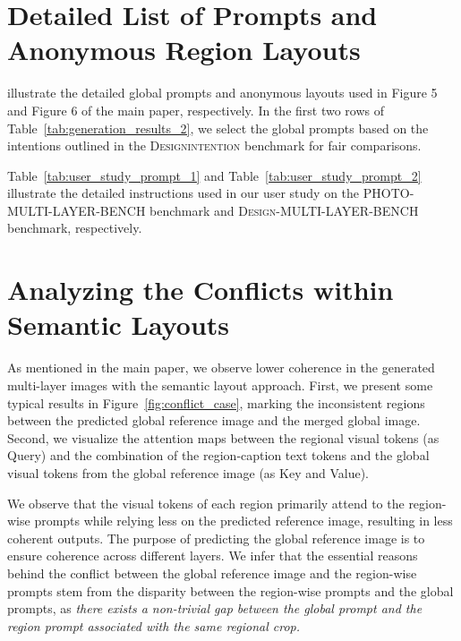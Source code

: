 \clearpage

\setcounter{page}{1}
\setcounter{section}{0}
\setcounter{figure}{0}
\setcounter{table}{0}
\setcounter{equation}{0}

\maketitlesupplementary


\vspace{1mm}
\section{Detailed List of Prompts and Anonymous Region Layouts}
 illustrate the detailed global prompts and anonymous layouts used in Figure 5 and Figure 6 of the main paper, respectively.
In the first two rows of Table~\ref{tab:generation_results_2}, we select the global prompts based on the intentions outlined in the \textsc{Designintention} benchmark for fair comparisons.

Table~\ref{tab:user_study_prompt_1} and Table~\ref{tab:user_study_prompt_2} illustrate the detailed instructions used in our user study on the \textsc{PHOTO-MULTI-LAYER-BENCH} benchmark and \textsc{Design-MULTI-LAYER-BENCH} benchmark, respectively.

\vspace{1mm}
\section{Analyzing the Conflicts within Semantic Layouts}
As mentioned in the main paper, we observe lower coherence in the generated multi-layer images with the semantic layout approach.
First, we present some typical results in Figure~\ref{fig:conflict_case}, marking the inconsistent regions between the predicted global reference image and the merged global image. Second, we visualize the attention maps between the regional visual tokens (as Query) and the combination of the region-caption text tokens and the global visual tokens from the global reference image (as Key and Value).

We observe that the visual tokens of each region primarily attend to the region-wise prompts while relying less on the predicted reference image, resulting in less coherent outputs. The purpose of predicting the global reference image is to ensure coherence across different layers. We infer that the essential reasons behind the conflict between the global reference image and the region-wise prompts stem from the disparity between the region-wise prompts and the global prompts, as \emph{there exists a non-trivial gap between the global prompt and the region prompt associated with the same regional crop.}

